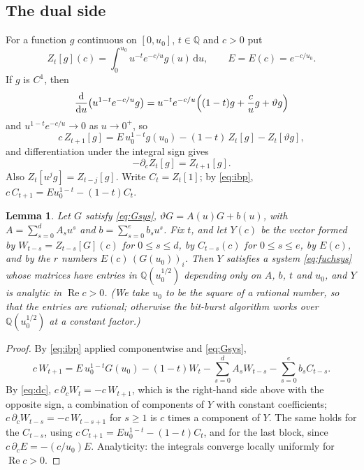 \documentclass[11pt,reqno]{amsart}
\newtheorem{lemma}[theorem]{Lemma}
\theoremstyle{definition}
\theoremstyle{remark}
\newcommand{\dd}{\,\mathrm{d}}
\newcommand{\QQ}{\mathbb{Q}}
\begin{document}
\subsection{The dual side}\label{sec:dualgen}
For a function $g$ continuous on $[0, u_0]$, $t \in \QQ$ and $c > 0$ put
\[
  Z_t[g](c) = \int_0^{u_0} u^{-t} e^{-c/u} g(u)\dd u, \qquad E = E(c) = e^{-c/u_0}.
\]
If $g$ is $C^1$, then
\[
  \frac{\mathrm{d}}{\mathrm{d}u}\bigl(u^{1-t}e^{-c/u}g\bigr) = u^{-t}e^{-c/u}\Bigl((1-t)g + \frac cu g + \vartheta g\Bigr)
\]
and $u^{1-t}e^{-c/u} \to 0$ as $u \to 0^+$, so
\begin{equation}\label{eq:ibp}
  c\, Z_{t+1}[g] = E\, u_0^{1-t} g(u_0) - (1-t)\, Z_t[g] - Z_t[\vartheta g],
\end{equation}
and differentiation under the integral sign gives
\begin{equation}\label{eq:dc}
  -\partial_c Z_t[g] = Z_{t+1}[g].
\end{equation}
Also $Z_t[u^j g] = Z_{t-j}[g]$. Write $C_t = Z_t[1]$; by \eqref{eq:ibp},
$c\,C_{t+1} = E u_0^{1-t} - (1-t) C_t$.

\begin{lemma}\label{lem:moments}
Let $G$ satisfy \eqref{eq:Gsys}, $\vartheta G = A(u)G + b(u)$, with $A = \sum_{s=0}^{d} A_s u^s$ and
$b = \sum_{s=0}^{e} b_s u^s$. Fix $t$, and let $Y(c)$ be the vector formed by
$W_{t-s} = Z_{t-s}[G](c)$ for $0 \le s \le d$, by $C_{t-s}(c)$ for $0 \le s \le e$, by $E(c)$, and by the $r$ numbers
$E(c)\, (G(u_0))_i$. Then $Y$ satisfies a system \eqref{eq:fuchsys} whose matrices have entries in $\QQ(u_0^{1/2})$
depending only on $A$, $b$, $t$ and $u_0$, and $Y$ is analytic in $\operatorname{Re} c > 0$. (We take $u_0$ to be the
square of a rational number, so that the entries are rational; otherwise the bit-burst algorithm works over
$\QQ(u_0^{1/2})$ at a constant factor.)
\end{lemma}

\begin{proof}
By \eqref{eq:ibp} applied componentwise and \eqref{eq:Gsys},
\[
  c\, W_{t+1} = E\, u_0^{1-t} G(u_0) - (1-t) W_t - \sum_{s=0}^d A_s W_{t-s} - \sum_{s=0}^{e} b_s C_{t-s}.
\]
By \eqref{eq:dc}, $c\,\partial_c W_t = -c\,W_{t+1}$, which is the right-hand side above with the opposite sign,
a combination of components of $Y$ with constant coefficients; $c\,\partial_c W_{t-s} = -c\, W_{t-s+1}$ for
$s \ge 1$ is $c$ times a component of $Y$. The same holds for the $C_{t-s}$, using
$c\, C_{t+1} = E u_0^{1-t} - (1-t)C_t$, and for the last block, since $c\,\partial_c E = -(c/u_0)E$.
Analyticity: the integrals converge locally uniformly for $\operatorname{Re} c > 0$.
\end{proof}
\end{document}
